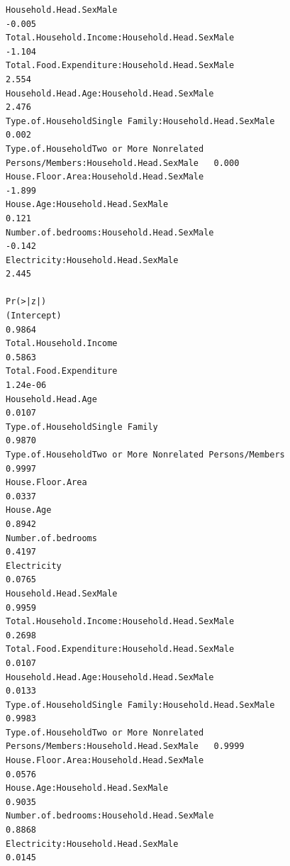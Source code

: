 \documentclass[
]{article}
\begin{document}
\begin{verbatim}
Household.Head.SexMale                                                          -0.005
Total.Household.Income:Household.Head.SexMale                                   -1.104
Total.Food.Expenditure:Household.Head.SexMale                                    2.554
Household.Head.Age:Household.Head.SexMale                                        2.476
Type.of.HouseholdSingle Family:Household.Head.SexMale                            0.002
Type.of.HouseholdTwo or More Nonrelated Persons/Members:Household.Head.SexMale   0.000
House.Floor.Area:Household.Head.SexMale                                         -1.899
House.Age:Household.Head.SexMale                                                 0.121
Number.of.bedrooms:Household.Head.SexMale                                       -0.142
Electricity:Household.Head.SexMale                                               2.445
                                                                               Pr(>|z|)
(Intercept)                                                                      0.9864
Total.Household.Income                                                           0.5863
Total.Food.Expenditure                                                         1.24e-06
Household.Head.Age                                                               0.0107
Type.of.HouseholdSingle Family                                                   0.9870
Type.of.HouseholdTwo or More Nonrelated Persons/Members                          0.9997
House.Floor.Area                                                                 0.0337
House.Age                                                                        0.8942
Number.of.bedrooms                                                               0.4197
Electricity                                                                      0.0765
Household.Head.SexMale                                                           0.9959
Total.Household.Income:Household.Head.SexMale                                    0.2698
Total.Food.Expenditure:Household.Head.SexMale                                    0.0107
Household.Head.Age:Household.Head.SexMale                                        0.0133
Type.of.HouseholdSingle Family:Household.Head.SexMale                            0.9983
Type.of.HouseholdTwo or More Nonrelated Persons/Members:Household.Head.SexMale   0.9999
House.Floor.Area:Household.Head.SexMale                                          0.0576
House.Age:Household.Head.SexMale                                                 0.9035
Number.of.bedrooms:Household.Head.SexMale                                        0.8868
Electricity:Household.Head.SexMale                                               0.0145
                                                                                  

\end{verbatim}
\end{document}
